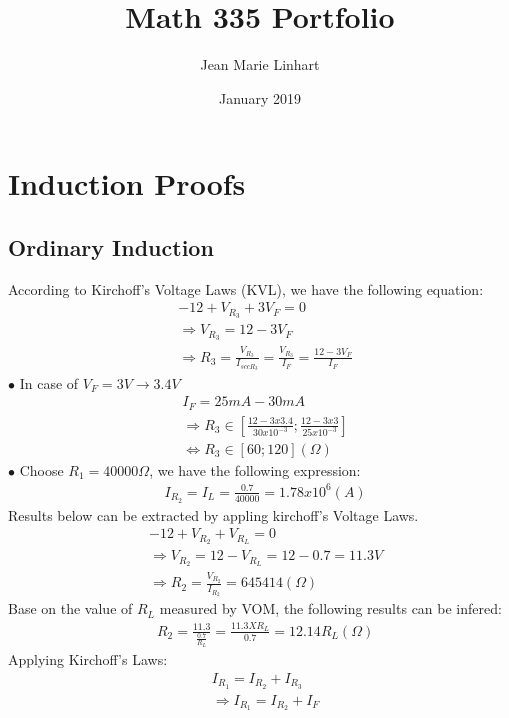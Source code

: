 \documentclass[12pt]{extarticle}
\title{Math 335 Portfolio}
\author{Jean Marie Linhart}
\date{January 2019}
\newcommand{\<}{\langle}
\renewcommand{\>}{\rangle}
\theoremstyle{definition}
\begin{document}
\maketitle

\section{Induction Proofs}
\subsection{Ordinary Induction}
\begin{normalsize}
According to Kirchoff's Voltage Laws (KVL), we have the following equation:
\begin{align*}
&-12 + V_{R_3} + 3V_F = 0\\
&\Longrightarrow V_{R_3} = 12 - 3V_F\\
&\Longrightarrow R_3 = \frac{V_{R_3}}{I_{sccR_3}} = \frac{V_{R_3}}{I_F} = \frac{12 - 3V_F}{I_F}
\end{align*}
$\bullet$ In case of $V_F  = 3V \longrightarrow 3.4V$
\begin{align*}
&I_F = 25mA - 30mA\\
&\Longrightarrow R_3 \in \left[\frac{12 - 3x3.4}{30x10^{-3}} ; \frac{12 - 3x3}{25x10^{-3}}\right]\\
&\iff R_3 \in [60 ; 120] (\Omega)
\end{align*}
$\bullet$ Choose $R_1 = 40000\Omega$, we have the following expression:
\begin{align*}
&I_{R_2} = I_L = \frac{0.7}{40000} = 1.78x10^6(A)
\end{align*}
Results below can be extracted by appling kirchoff's Voltage Laws. 
\begin{align*}
&-12 + V_{R_2} + V_{R_L} = 0\\
&\Longrightarrow V_{R_2} = 12 - V_{R_L} = 12 - 0.7 = 11.3V\\
&\Longrightarrow R_2 = \frac{V_{R_2}}{I_{R_2}} = 645414 (\Omega)
\end{align*}
Base on the value of $R_L$ measured by VOM, the following results can be infered:
\begin{align*}
&R_2 = \frac{11.3}{\frac{0.7}{R_L}} = \frac{11.3 X R_L}{0.7} = 12.14R_L (\Omega)
\end{align*}
Applying Kirchoff's Laws:
\begin{align*}
&I_{R_1} = I_{R_2} + I_{R_3}\\
&\Longrightarrow I_{R_1} = I_{R_2} + I_F\\

\end{align*}
\end{normalsize}
\end{document}
